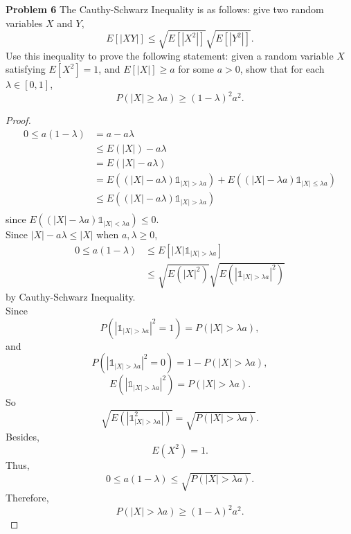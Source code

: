 \documentclass{article}
\newcommand{\idca}{\mathbb{1}}
\begin{document}
\newpage

\noindent \textbf{Problem 6} The Cauthy-Schwarz Inequality is as follows: give two random variables $X$ and $Y$,
\[E[\left|XY\right|] \leq \sqrt{E\left[\left|X^2\right|\right]}\sqrt{E\left[\left|Y^2\right|\right]}.\]
Use this inequality to prove the following statement: given a random variable $X$ satisfying $E\left[X^2\right] = 1$, and $E[\left|X\right|] \geq a$ for some $a > 0$, show that for each $\lambda \in [0,1]$,
\[ P(\left|X\right| \geq \lambda a ) \geq (1-\lambda)^2a^2.\]

\begin{proof}
	\begin{align*}	
		0 \leq a(1-\lambda) &= a-a\lambda\\ 
	  			     &\leq E(|X|) - a\lambda \\
	  					   &= E(|X| - a \lambda) \\
	  					   &= E\left((|X|-a\lambda)\idca_{|X|>\lambda a}\right) + E\left((|X|-\lambda a)\idca_{|X| \leq \lambda a}\right) \\
	  					   &\leq E\left((|X|-a\lambda)\idca_{|X|>\lambda a}\right) \\
	\end{align*}
  since $E\left((|X|-\lambda a)\idca_{|X|<\lambda a}\right) \leq 0$.\\
    Since $|X|-a\lambda \leq  |X|$ when $a,\lambda \geq 0$,
    \begin{align*}
		0 \leq a(1-\lambda) & \leq  E[|X|\idca_{|X|>\lambda a}] \\
	  							   				  	 & \leq \sqrt{E\left(|X|^2\right)} \sqrt{E\left(\left|\idca_{|X|>\lambda a}\right|^2\right)}
	\end{align*}
	by Cauthy-Schwarz Inequality.\\
	Since 
  	\[P\left(\left|\idca_{|X|>\lambda a}\right|^2 = 1\right) = P(|X|>\lambda a),\]
  	and
  	\[P\left(\left|\idca_{|X|>\lambda a}\right|^2 = 0\right) = 1-P(|X|>\lambda a),\]
  	\[E\left(\left|\idca_{|X|>\lambda a}\right|^2\right) = P(|X|>\lambda a).\]
  	So 
  	\[\sqrt{E\left(\left|\idca_{|X|>\lambda a}^2\right|\right)} = \sqrt{P(|X|>\lambda a)}.\]
	Besides, 
	\[ E\left(X^2\right) =1.\]
	Thus,
	\[0 \leq a(1-\lambda) \leq  \sqrt{P(|X|>\lambda a)}. \]
	Therefore, 
	\[P(|X|>\lambda a) \geq (1-\lambda)^2a^2.\]

 \end{proof}


 
\end{document}
